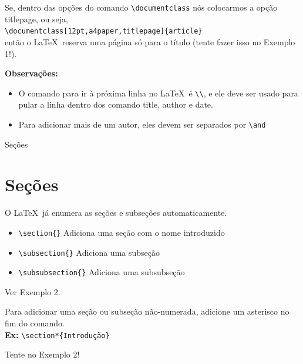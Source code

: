 \documentclass[12pt]{beamer}
\begin{document}
\begin{frame}[fragile]
  Se, dentro das opções do comando \verb+\documentclass+ nós colocarmos a opção titlepage, ou seja,\\
  \medskip
  \verb+\documentclass[12pt,a4paper,titlepage]{article}+\\
  \medskip
  então o \LaTeX\ reserva uma página só para o título (tente fazer isso no Exemplo 1!).
\end{frame}

\begin{frame}[fragile]
  \textbf{Observações:}\\
  \begin{itemize}
    \item O comando para ir à próxima linha no \LaTeX\ é \verb+\\+, e ele deve ser usado para pular a linha dentro dos comando title, author e date.
    \item Para adicionar mais de um autor, eles devem ser separados por \verb+\and+
  \end{itemize}
\end{frame}

\begin{frame}[fragile]{Seções}
  \section{Seções}
  O \LaTeX\ já enumera as seções e subseções automaticamente.
  \begin{itemize}
    \item \verb+\section{}+ Adiciona uma seção com o nome introduzido
    \item \verb+\subsection{}+ Adiciona uma subseção
    \item \verb+\subsubsection{}+ Adiciona uma subsubseção
  \end{itemize}
  \bigskip
  Ver Exemplo 2.
\end{frame}

\begin{frame}[fragile]
  Para adicionar uma seção ou subseção não-numerada, adicione um asterisco no fim do comando.\\
  \medskip
  \textbf{Ex:} \verb+\section*{Introdução}+
  \medskip

  Tente no Exemplo 2!
\end{frame}
\end{document}
